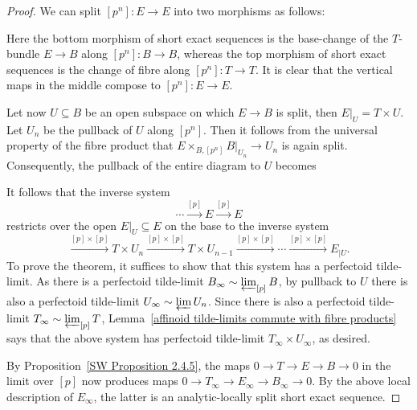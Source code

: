 \documentclass[10pt,oneside]{amsart}
\theoremstyle{definition}
\newcommand{\id}{{\operatorname{id}}}
\begin{document}
	\begin{proof}
	We can split $[p^n]:E\to E$ into two morphisms as follows:
			\begin{center}
				\end{center}
			Here the bottom morphism of short exact sequences is the base-change of the $T$-bundle $E\to B$ along $[p^n]:B\to B$, whereas the top morphism of short exact sequences is the change of fibre along $[p^n]:T\to T$. It is clear that the vertical maps in the middle compose to $[p^n]:E\to E$.
			
			Let now $U\subseteq B$ be an open subspace on which $E\to B$ is split, then $E|_U=T\times U$. Let $U_n$ be the pullback of $U$ along $[p^n]$. Then it follows from the universal property of the fibre product that $E\times_{B,[p^n]}B|_{U_n}\to U_n$ is again split. Consequently, the pullback of the entire diagram to $U$ becomes
					\begin{center}
						\end{center}
				It follows that the inverse system \[\cdots \xrightarrow{[p]}E\xrightarrow{[p]}E\]
			 	restricts over the open $E|_U\subseteq E$ on the base to the inverse system
				\[\xrightarrow{[p]\times [p]}T\times U_n\xrightarrow{[p]\times [p]}T\times U_{n-1}\xrightarrow{[p]\times [p]}\cdots \xrightarrow{[p]\times [p]}E_{|U}. \]
				To prove the theorem, it suffices to show that this system has a perfectoid tilde-limit.
				As there is a perfectoid tilde-limit $B_\infty\sim \varprojlim_{[p]} B$, by pullback to $U$ there is also a perfectoid tilde-limit $U_\infty\sim \varprojlim U_n$. Since there is also a perfectoid tilde-limit $T_\infty\sim \varprojlim_{[p]} T$,  Lemma~\ref{affinoid tilde-limits commute with fibre products} says that the above system has perfectoid tilde-limit $T_\infty\times U_\infty$, as desired.
				
				By Proposition~\ref{SW Proposition 2.4.5}, the maps $0\to T\to E\to B\to 0$ in the limit over $[p]$ now produces maps $0\to T_\infty \to E_\infty\to B_\infty\to 0$. By the above local description of $E_\infty$, the latter is an analytic-locally split short exact sequence.
	\end{proof}
	
\end{document}
